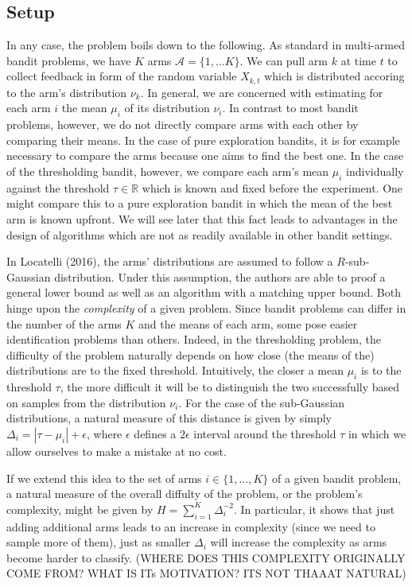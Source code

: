 \documentclass[12pt,]{article}
\begin{document}
\subsection{Setup}\label{setup}

In any case, the problem boils down to the following. As standard in
multi-armed bandit problems, we have \(K\) arms
\(\mathcal{A} = \{1, \dots K\}\). We can pull arm \(k\) at time \(t\) to
collect feedback in form of the random variable \(X_{k,t}\) which is
distributed accoring to the arm's distribution \(\nu_k\). In general, we
are concerned with estimating for each arm \(i\) the mean \(\mu_i\) of
its distribution \(\nu_i\). In contrast to most bandit problems,
however, we do not directly compare arms with each other by comparing
their means. In the case of pure exploration bandits, it is for example
necessary to compare the arms because one aims to find the best one. In
the case of the thresholding bandit, however, we compare each arm's mean
\(\mu_i\) individually against the threshold \(\tau \in \mathbb{R}\)
which is known and fixed before the experiment. One might compare this
to a pure exploration bandit in which the mean of the best arm is known
upfront. We will see later that this fact leads to advantages in the
design of algorithms which are not as readily available in other bandit
settings.

In Locatelli (2016), the arms' distributions are assumed to follow a
\(R\)-sub-Gaussian distribution. Under this assumption, the authors are
able to proof a general lower bound as well as an algorithm with a
matching upper bound. Both hinge upon the \emph{complexity} of a given
problem. Since bandit problems can differ in the number of the arms
\(K\) and the means of each arm, some pose easier identification
problems than others. Indeed, in the thresholding problem, the
difficulty of the problem naturally depends on how close (the means of
the) distributions are to the fixed threshold. Intuitively, the closer a
mean \(\mu_i\) is to the threshold \(\tau\), the more difficult it will
be to distinguish the two successfully based on samples from the
distribution \(\nu_i\). For the case of the sub-Gaussian distributions,
a natural measure of this distance is given by simply
\(\Delta_i = |\tau - \mu_i| + \epsilon\), where \(\epsilon\) defines a
\(2\epsilon\) interval around the threshold \(\tau\) in which we allow
ourselves to make a mistake at no cost.

If we extend this idea to the set of arms \(i \in \{1,...,K\}\) of a
given bandit problem, a natural measure of the overall diffulty of the
problem, or the problem's complexity, might be given by
\(H = \sum_{i=1}^{K} \Delta_i^{-2}\). In particular, it shows that just
adding additional arms leads to an increase in complexity (since we need
to sample more of them), just as smaller \(\Delta_i\) will increase the
complexity as arms become harder to classify. (WHERE DOES THIS
COMPLEXITY ORIGINALLY COME FROM? WHAT IS ITs MOTIVATION? ITS NOT THAAAT
NATURAL)
\end{document}
